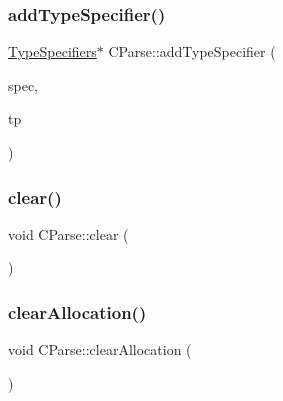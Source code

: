 \mbox{\label{class_c_parse_ad76297f3360b0c10be30d77aa3883a9e}} 
\subsubsection{\texorpdfstring{addTypeSpecifier()}{addTypeSpecifier()}}
{\footnotesize\ttfamily \mbox{\hyperlink{struct_type_specifiers}{Type\+Specifiers}}$\ast$ C\+Parse\+::add\+Type\+Specifier (\begin{DoxyParamCaption}\item[{\mbox{\hyperlink{struct_type_specifiers}{Type\+Specifiers}} $\ast$}]{spec,  }\item[{\mbox{\hyperlink{class_datatype}{Datatype}} $\ast$}]{tp }\end{DoxyParamCaption})}

\mbox{\label{class_c_parse_a31d28fe36d46c4a203e5fc919f85bc89}} 
\subsubsection{\texorpdfstring{clear()}{clear()}}
{\footnotesize\ttfamily void C\+Parse\+::clear (\begin{DoxyParamCaption}\item[{void}]{ }\end{DoxyParamCaption})}

\mbox{\label{class_c_parse_a2b275d0adfbf23c3d6241f3cd52dc7a3}} 
\subsubsection{\texorpdfstring{clearAllocation()}{clearAllocation()}}
{\footnotesize\ttfamily void C\+Parse\+::clear\+Allocation (\begin{DoxyParamCaption}\item[{void}]{ }\end{DoxyParamCaption})}

\mbox{\label{class_c_parse_afeb074247c8851b2b06e912964e7cc30}} 
